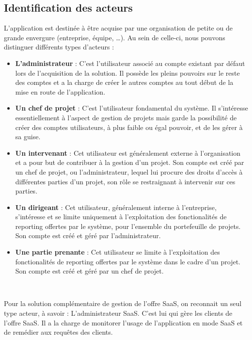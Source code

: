 \begin{spacing}{1.5}
\subsection{Identification des acteurs}
L’application est destinée à être acquise par une organisation de petite ou de grande envergure (entreprise, équipe, …). Au sein de celle-ci, nous pouvons distinguer différents types d'acteurs :
\begin{itemize}
    \item \textbf{L'administrateur} : C’est l'utilisateur associé au compte existant par défaut lors de l'acquisition de la solution. Il possède les pleins pouvoirs sur le reste des comptes et a la charge de créer le autres comptes au tout début de la mise en route de l'application.
    \item \textbf{Un chef de projet} : C’est l'utilisateur fondamental du système. Il s'intéresse essentiellement à l'aspect de gestion de projets mais garde la possibilité de créer des comptes utilisateurs, à plus faible ou égal pouvoir, et de les gérer à sa guise.
    \item \textbf{Un intervenant} : Cet utilisateur est généralement externe à l'organisation et a pour but de contribuer à la gestion d'un projet. Son compte est créé par un chef de projet, ou l'administrateur, lequel lui procure des droits d'accès à différentes parties d'un projet, son rôle se restraignant à intervenir sur ces parties.
    \item \textbf{Un dirigeant} : Cet utilisateur, généralement interne à l'entreprise, s'intéresse et se limite uniquement à l'exploitation des fonctionalités de reporting offertes par le système, pour l'ensemble du portefeuille de projets. Son compte est créé et géré par l'administrateur.
    \item \textbf{Une partie prenante} : Cet utilisateur se limite à l'exploitation des fonctionalités de reporting offertes par le système dans le cadre d'un projet. Son compte est créé et géré par un chef de projet.
\end{itemize}
\

Pour la solution complémentaire de gestion de l’offre SaaS, on reconnait un seul type acteur, à savoir : L'administrateur SaaS. C’est lui qui gère les clients de l’offre SaaS. Il a la charge de monitorer l’usage de l’application en mode SaaS et de remédier aux requêtes des clients.


\end{spacing}
